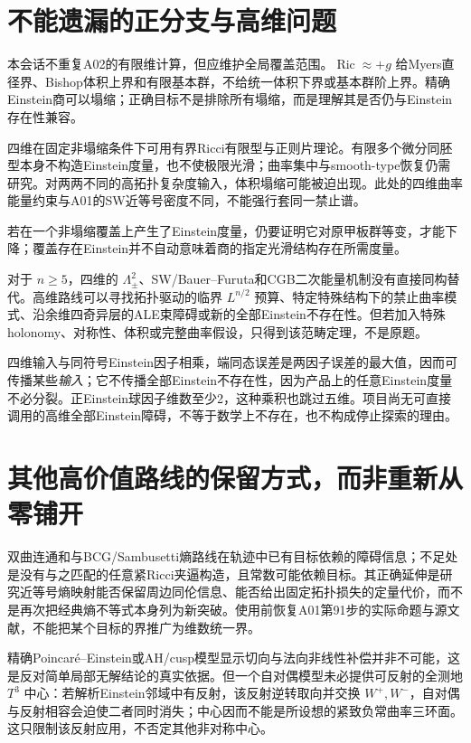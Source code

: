 \documentclass[UTF8,a4paper,11pt,fontset=fandol]{ctexart}
\numberwithin{equation}{section}
\theoremstyle{definition}
\newcommand{\Ric}{\operatorname{Ric}}
\begin{document}
\section{不能遗漏的正分支与高维问题}
本会话不重复A02的有限维计算，但应维护全局覆盖范围。$\Ric\approx+g$ 给Myers直径界、Bishop体积上界和有限基本群，不给统一体积下界或基本群阶上界。精确Einstein商可以塌缩；正确目标不是排除所有塌缩，而是理解其是否仍与Einstein存在性兼容。

四维在固定非塌缩条件下可用有界Ricci有限型与正则片理论\cite{CN}。有限多个微分同胚型本身不构造Einstein度量，也不使极限光滑；曲率集中与smooth-type恢复仍需研究。对两两不同的高拓扑复杂度输入，体积塌缩可能被迫出现。此处的四维曲率能量约束与A01的SW近等号密度不同，不能强行套同一禁止谱。

若在一个非塌缩覆盖上产生了Einstein度量，仍要证明它对原甲板群等变，才能下降；覆盖存在Einstein并不自动意味着商的指定光滑结构存在所需度量。

对于 $n\ge5$，四维的 $\Lambda^2_\pm$、SW/Bauer--Furuta和CGB二次能量机制没有直接同构替代。高维路线可以寻找拓扑驱动的临界 $L^{n/2}$ 预算、特定特殊结构下的禁止曲率模式、沿余维四奇异层的ALE束障碍或新的全部Einstein不存在性。但若加入特殊holonomy、对称性、体积或完整曲率假设，只得到该范畴定理，不是原题。

四维输入与同符号Einstein因子相乘，端同态误差是两因子误差的最大值，因而可传播某些\emph{输入}；它不传播全部Einstein不存在性，因为产品上的任意Einstein度量不必分裂。正Einstein球因子维数至少2，这种乘积也跳过五维。项目尚无可直接调用的高维全部Einstein障碍，不等于数学上不存在，也不构成停止探索的理由。


\section{其他高价值路线的保留方式，而非重新从零铺开}
双曲连通和与BCG/Sambusetti熵路线在轨迹中已有目标依赖的障碍信息；不足处是没有与之匹配的任意紧Ricci夹逼构造，且常数可能依赖目标。其正确延伸是研究近等号熵映射能否保留周边同伦信息、能否给出固定拓扑损失的定量代价，而不是再次把经典熵不等式本身列为新突破。使用前恢复A01第91步的实际命题与源文献，不能把某个目标的界推广为维数统一界。

精确Poincar\'e--Einstein或AH/cusp模型显示切向与法向非线性补偿并非不可能，这是反对简单局部无解结论的真实依据。但一个自对偶模型未必提供可反射的全测地 $T^3$ 中心：若解析Einstein邻域中有反射，该反射逆转取向并交换 $W^+,W^-$，自对偶与反射相容会迫使二者同时消失；中心因而不能是所设想的紧致负常曲率三环面。这只限制该反射应用，不否定其他非对称中心。
\end{document}
